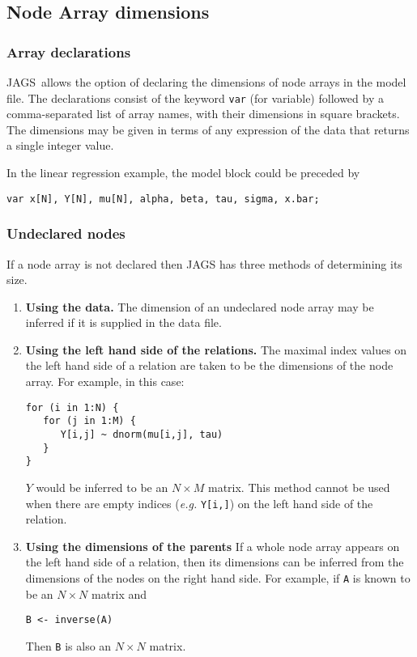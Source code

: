 \documentclass[11pt, a4paper, titlepage]{report}
\newcommand{\JAGS}{\textsf{JAGS}}
\begin{document}
\subsection{Node Array dimensions}

\subsubsection*{Array declarations}

\JAGS\ allows the option of declaring the dimensions of node arrays in
the model file. The declarations consist of the keyword \texttt{var}
(for variable) followed by a comma-separated list of array names, with
their dimensions in square brackets. The dimensions may be given in
terms of any expression of the data that returns a single integer
value.

In the linear regression example, the model block could be preceded by
\begin{verbatim}
var x[N], Y[N], mu[N], alpha, beta, tau, sigma, x.bar;
\end{verbatim}

\subsubsection*{Undeclared nodes}

If a node array is not declared then JAGS has three methods of
determining its size.
\begin{enumerate}
\item {\bf Using the data.}  The dimension of an undeclared node array
  may be inferred if it is supplied in the data file.
\item {\bf Using the left hand side of the relations.}  The maximal
  index values on the left hand side of a relation are taken to be the
  dimensions of the node array.  For example, in this case:
\begin{verbatim}
for (i in 1:N) {
   for (j in 1:M) {
      Y[i,j] ~ dnorm(mu[i,j], tau)
   }
}
\end{verbatim}
$Y$ would be inferred to be an $N \times M$ matrix. This method cannot 
be used when there are empty indices ({\em e.g.} \verb+Y[i,]+) on the left
hand side of the relation.
\item {\bf Using the dimensions of the parents} If a whole node array
  appears on the left hand side of a relation, then its dimensions can
  be inferred from the dimensions of the nodes on the right hand side.
  For example, if \verb+A+ is known to be an $N \times N$ matrix
  and
\begin{verbatim}
B <- inverse(A)
\end{verbatim}
Then \verb+B+ is also an $N \times N$ matrix.
\end{enumerate}
\end{document}

